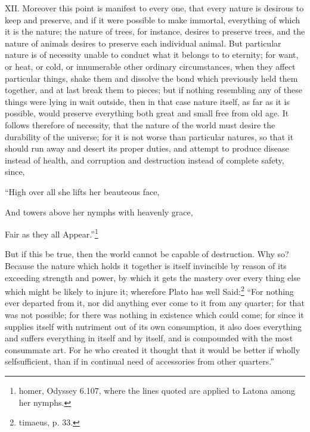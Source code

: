 XII. Moreover this point is manifest to every one, that every nature is desirous to keep and
preserve, and if it were possible to make immortal, everything of which it is the nature; the nature of
trees, for instance, desires to preserve trees, and the nature of animals desires to preserve each
individual animal. But particular nature is of necessity unable to conduct what it belongs to to
eternity; for want, or heat, or cold, or innumerable other ordinary circumstances, when they affect
particular things, shake them and dissolve the bond which previously held them together, and at last
break them to pieces; but if nothing resembling any of these things were lying in wait outside, then
in that case nature itself, as far as it is possible, would preserve everything both great and small
free from old age. It follows therefore of necessity, that the nature of the world must desire the
durability of the universe; for it is not worse than particular natures, so that it should run away and
desert its proper duties, and attempt to produce disease instead of health, and corruption and
destruction instead of complete safety, since,

``High over all she lifts her beauteous face,

And towers above her nymphs with heavenly grace,

Fair as they all Appear.''\footnote{homer, Odyssey 6.107, where the lines quoted are applied to Latona among her
nymphs.}

But if this be true, then the world cannot be capable of destruction. Why so? Because the nature
which holds it together is itself invincible by reason of its exceeding strength and power, by which it
gets the mastery over every thing else which might be likely to injure it; wherefore Plato has well
Said:\footnote{timaeus, p. 33.} ``For nothing ever departed from it, nor did anything ever come to it from any
quarter; for that was not possible; for there was nothing in existence which could come; for since it
supplies itself with nutriment out of its own consumption, it also does everything and suffers
everything in itself and by itself, and is compounded with the most consummate art. For he who
created it thought that it would be better if wholly selfsufficient, than if in continual need of
accessories from other quarters.''

